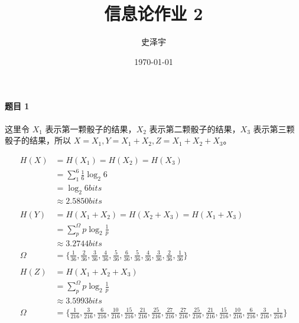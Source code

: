 \documentclass{ctexart}
\title{信息论作业 2}
\author{史泽宇}
\date{\today}
\begin{document}
\maketitle

\paragraph{题目 1}

这里令 $X_1$ 表示第一颗骰子的结果，$X_2$ 表示第二颗骰子的结果，$X_3$ 表示第三颗骰子的结果，所以 $X = X_1, Y = X_1 + X_2, Z = X_1 + X_2 + X_3$。

\begin{align}
    H(X) &= H(X_1) = H(X_2) = H(X_3) \\
    &= \sum_1^6 \frac{1}{6}\log_2 6 \\
    &= \log_2 6 bits \\
    &\approx 2.5850 bits \\
    \\
    H(Y) &= H(X_1 + X_2) = H(X_2 + X_3) = H(X_1 + X_3) \\
    &= \sum_p^\Omega p\log_2 \frac{1}{p} \\
    &\approx 3.2744 bits \\
    \Omega &= \{\frac{1}{36}, \frac{2}{36}, \frac{3}{36}, \frac{4}{36}, \frac{5}{36}, \frac{6}{36}, \frac{5}{36}, \frac{4}{36}, \frac{3}{36}, \frac{2}{36}, \frac{1}{36}\} \\
    \\
    H(Z) &= H(X_1 + X_2 + X_3) \\
    &= \sum_p^\Omega p\log_2 \frac{1}{p} \\
    &\approx 3.5993 bits \\
    \Omega &= \{\frac{1}{216}, \frac{3}{216}, \frac{6}{216}, \frac{10}{216}, \frac{15}{216}, \frac{21}{216}, \frac{25}{216}, \frac{27}{216}, \frac{27}{216}, \frac{25}{216}, \frac{21}{216}, \frac{15}{216}, \frac{10}{216}, \frac{6}{216}, \frac{3}{216}, \frac{1}{216}\}
\end{align}
\end{document}
